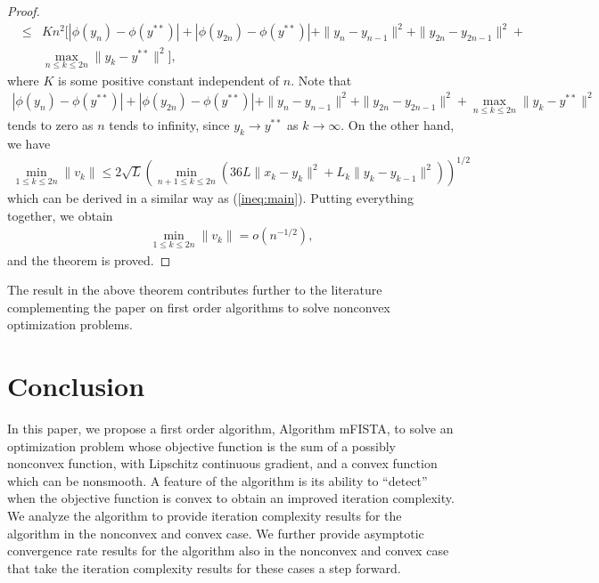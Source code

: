 \documentclass[11pt]{article}
\begin{document}
\begin{proof}
\begin{eqnarray*}
& \leq & K n^2 [ |\phi(y_n) - \phi(y^{\ast\ast})| + |\phi(y_{2n}) - \phi(y^{\ast\ast})| + \| y_n - y_{n-1} \|^2 + \|y_{2n} - y_{2n-1} \|^2 + \\
&   & \max_{n \leq k \leq 2n} \| y_{k} - y^{\ast\ast} \|^2],
\end{eqnarray*}
where $K$ is some positive constant independent of $n$.  Note that 
\begin{eqnarray*}
 |\phi(y_n) - \phi(y^{\ast\ast})| + |\phi(y_{2n}) - \phi(y^{\ast\ast})| + \| y_n - y_{n-1} \|^2 + \|y_{2n} - y_{2n-1} \|^2 +  \max_{n \leq k \leq 2n} \| y_{k} - y^{\ast\ast} \|^2
 \end{eqnarray*}
 tends to zero as $n$ tends to infinity, since $y_k \rightarrow y^{\ast\ast}$ as $k \rightarrow \infty$.   On the other hand, we have
 \begin{eqnarray*}
\min_{1 \leq k \leq 2n} \| v_k \| \leq 2 \sqrt{L}  \left( \min_{n+1 \leq k \leq 2n} \left( 36L \| x_k - y_k \|^2 + L_k \| y_k - y_{k-1} \|^2  \right) \right)^{1/2}
\end{eqnarray*} 
which can be derived in a similar way as  (\ref{ineq:main}).  Putting everything together, we obtain
\begin{eqnarray*}
\min_{1 \leq k \leq 2n} \| v_k \|  = o(n^{-1/2}),
\end{eqnarray*}
and the theorem is proved.
\end{proof}

\vspace{10pt}

\noindent The result in the above theorem contributes further to the literature complementing the paper \cite{Gratton} on first order algorithms to solve nonconvex optimization problems.

\section{Conclusion}\label{sec:conclusion}

In this paper, we propose a first order algorithm, Algorithm mFISTA, to solve an optimization problem whose objective function is the sum of a possibly nonconvex function, with Lipschitz continuous gradient, and a convex function which can be nonsmooth.  A feature of the algorithm is its ability to ``detect'' when the objective function is convex to obtain an improved iteration complexity.  We analyze the algorithm to provide iteration complexity results for the algorithm in the nonconvex and convex case.  We further provide asymptotic convergence rate results for the algorithm also in the nonconvex and convex case that take the iteration complexity results for these cases a step forward.
\end{document}
